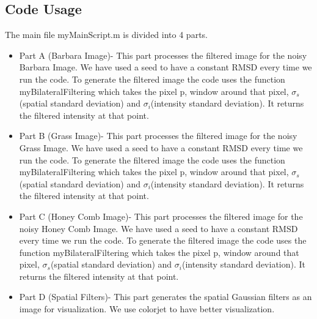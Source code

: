 \documentclass[12pt, a4paper]{article}
\begin{document}
\subsection*{Code Usage}
The main file myMainScript.m is divided into 4 parts. 
\begin{itemize}
    \item Part A (Barbara Image)- This part processes the filtered image for the noisy Barbara Image. We have used a seed to have a constant RMSD every time we run the code. To generate the filtered image the code uses the function myBilateralFiltering which takes  the pixel p, window around that pixel, $\sigma_s$(spatial standard deviation) and $\sigma_i$(intensity standard deviation). It returns the filtered intensity at that point.
    \item Part B (Grass Image)- This part processes the filtered image for the noisy Grass Image. We have used a seed to have a constant RMSD every time we run the code. To generate the filtered image the code uses the function myBilateralFiltering which takes  the pixel p, window around that pixel, $\sigma_s$(spatial standard deviation) and $\sigma_i$(intensity standard deviation). It returns the filtered intensity at that point.
    \item Part C (Honey Comb Image)- This part processes the filtered image for the noisy Honey Comb Image. We have used a seed to have a constant RMSD every time we run the code. To generate the filtered image the code uses the function myBilateralFiltering which takes  the pixel p, window around that pixel, $\sigma_s$(spatial standard deviation) and $\sigma_i$(intensity standard deviation). It returns the filtered intensity at that point.
    \item Part D (Spatial Filters)- This part generates the spatial Gaussian filters as an image for visualization. We use colorjet to have better visualization.
\end{itemize}
\end{document}

